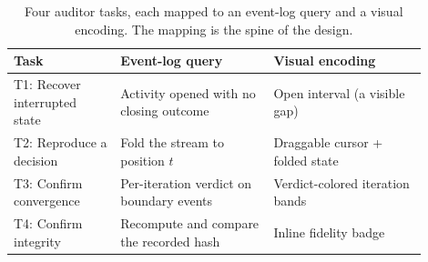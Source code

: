 \begin{table}[t]
  \centering
  \caption{Four auditor tasks, each mapped to an event-log query and a visual
  encoding. The mapping is the spine of the design.}
  \label{tab:tasks}
  \footnotesize
  \begin{tabular}{@{}p{0.235\linewidth}p{0.33\linewidth}p{0.33\linewidth}@{}}
    \toprule
    \textbf{Task} & \textbf{Event-log query} & \textbf{Visual encoding} \\
    \midrule
    T1: Recover interrupted state &
      Activity opened with no closing outcome &
      Open interval (a visible gap) \\[0.4em]
    T2: Reproduce a decision &
      Fold the stream to position $t$ &
      Draggable cursor + folded state \\[0.4em]
    T3: Confirm convergence &
      Per-iteration verdict on boundary events &
      Verdict-colored iteration bands \\[0.4em]
    T4: Confirm integrity &
      Recompute and compare the recorded hash &
      Inline fidelity badge \\
    \bottomrule
  \end{tabular}
\end{table}

